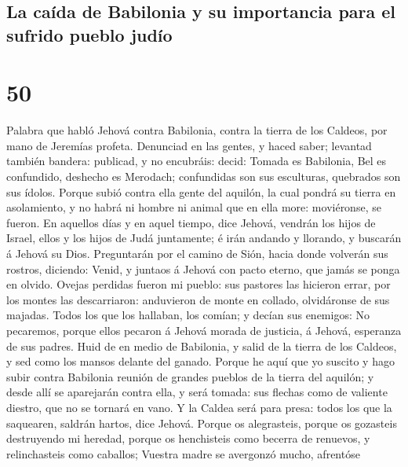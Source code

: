\hypertarget{la-cauxedda-de-babilonia-y-su-importancia-para-el-sufrido-pueblo-juduxedo}{%
\subsection{La caída de Babilonia y su importancia para el sufrido
pueblo
judío}\label{la-cauxedda-de-babilonia-y-su-importancia-para-el-sufrido-pueblo-juduxedo}}

\hypertarget{section-49}{%
\section{50}\label{section-49}}

 Palabra que habló Jehová contra Babilonia, contra la tierra
de los Caldeos, por mano de Jeremías profeta.  Denunciad en
las gentes, y haced saber; levantad también bandera: publicad, y no
encubráis: decid: Tomada es Babilonia, Bel es confundido, deshecho es
Merodach; confundidas son sus esculturas, quebrados son sus ídolos.
 Porque subió contra ella gente del aquilón, la cual pondrá
su tierra en asolamiento, y no habrá ni hombre ni animal que en ella
more: moviéronse, se fueron.  En aquellos días y en aquel
tiempo, dice Jehová, vendrán los hijos de Israel, ellos y los hijos de
Judá juntamente; é irán andando y llorando, y buscarán á Jehová su Dios.
 Preguntarán por el camino de Sión, hacia donde volverán sus
rostros, diciendo: Venid, y juntaos á Jehová con pacto eterno, que jamás
se ponga en olvido.  Ovejas perdidas fueron mi pueblo: sus
pastores las hicieron errar, por los montes las descarriaron: anduvieron
de monte en collado, olvidáronse de sus majadas.  Todos los
que los hallaban, los comían; y decían sus enemigos: No pecaremos,
porque ellos pecaron á Jehová morada de justicia, á Jehová, esperanza de
sus padres.  Huid de en medio de Babilonia, y salid de la
tierra de los Caldeos, y sed como los mansos delante del ganado.
 Porque he aquí que yo suscito y hago subir contra Babilonia
reunión de grandes pueblos de la tierra del aquilón; y desde allí se
aparejarán contra ella, y será tomada: sus flechas como de valiente
diestro, que no se tornará en vano.  Y la Caldea será para
presa: todos los que la saquearen, saldrán hartos, dice Jehová.
 Porque os alegrasteis, porque os gozasteis destruyendo mi
heredad, porque os henchisteis como becerra de renuevos, y relinchasteis
como caballos;  Vuestra madre se avergonzó mucho, afrentóse
